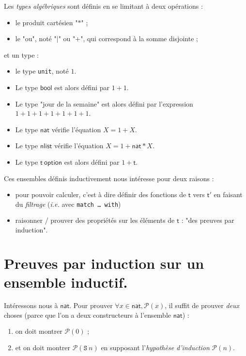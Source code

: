 \documentclass[../main]{subfiles}
\begin{document}
  \begin{defn}
    Les \textit{types algébriques} sont définis en se limitant à deux opérations :
    \begin{itemize}
      \item le produit cartésien "$*$" ;
      \item le "ou", noté "$|$" ou "$+$", qui correspond à la somme disjointe ;
    \end{itemize}
  et un type :
    \begin{itemize}
      \item le type \texttt{unit}, noté $1$.
    \end{itemize}
  \end{defn}


  \begin{exm}
    \begin{itemize}
      \item Le type $\mathsf{bool}$ est alors défini par $1 + 1$.
      \item Le type "jour de la semaine" est alors défini par l'expression $1 + 1 + 1 + 1 + 1 + 1 + 1$.
      \item Le type $\mathsf{nat}$ vérifie l'équation $X = 1 + X$.
      \item Le type $\mathsf{nlist}$ vérifie l'équation $X = 1 + \mathsf{nat} * X$.
      \item Le type  $\mathsf{t\ option}$ est alors défini par $1 + \mathsf{t}$.
    \end{itemize}
  \end{exm}

  Ces ensembles définis inductivement nous intéresse pour deux raisons :
  \begin{itemize}
    \item pour pouvoir calculer, c'est à dire définir des fonctions de $\mathsf{t}$ vers $\mathsf{t}'$ en faisant du \textit{filtrage} (\textit{i.e.} avec \texttt{match \ldots\ with})
    \item raisonner / prouver des propriétés sur les éléments de $\mathsf{t}$ : "des preuves par induction".
  \end{itemize}

  \section{Preuves par induction sur un ensemble inductif.}

  \begin{exm}
    Intéressons nous à $\mathsf{nat}$. Pour prouver $\forall  x \in \mathsf{nat}, \mathcal{P}(x)$, il suffit de prouver \textit{deux} choses (parce que l'on a deux constructeurs à l'ensemble $\mathsf{nat}$) :
    \begin{enumerate}
      \item on doit montrer $\mathcal{P}(0)$ ;
      \item et on doit montrer $\mathcal{P}(\mathtt{S}\ n)$ en supposant l'\textit{hypothèse d'induction} $\mathcal{P}(n)$.
    \end{enumerate}
  \end{exm}
\end{document}
